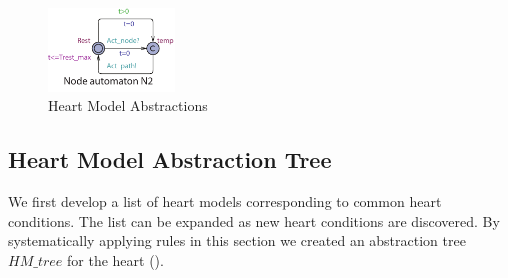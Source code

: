 \begin{figure}[!h]
	\centering
	\includegraphics[width=0.3\textwidth]{figs/rule6.pdf}
	\caption{\small Heart Model Abstractions}
	\label{fig:rule6}
\end{figure}

\subsection{Heart Model Abstraction Tree}
We first develop a list of heart models corresponding to common heart conditions. The list can be expanded as new heart conditions are discovered.
By systematically applying rules in this section we created an abstraction tree $HM\_tree$ for the heart (). 
